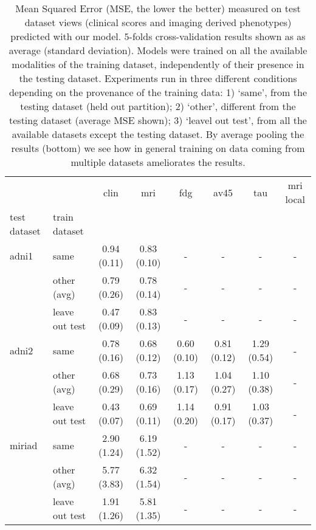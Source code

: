 \begin{table*}
\centering
\caption{
Mean Squared Error (MSE, the lower the better) measured on test dataset views (clinical scores and imaging derived phenotypes) predicted with our model.
$5$-folds cross-validation results shown as as average (standard deviation).
Models were trained on all the available modalities of the training dataset, independently of their presence in the testing dataset.
Experiments run in three different conditions depending on the provenance of the training data:
1) `same', from the testing dataset (held out partition);
2) `other', different from the testing dataset (average MSE shown);
3) `leavel out test', from all the available datasets except the testing dataset.
By average pooling the results (bottom) we see how in general training on data coming from multiple datasets ameliorates the results.
}
\label{tab:features}
\begin{tabular}{llcccccc}
\toprule
       &      &         clin &           mri &          fdg &         av45 &          tau &   mri local \\
test dataset & train dataset &              &               &              &              &              &              \\
\midrule
adni1  & same           &  0.94 (0.11) &  0.83 (0.10) &            - &            - &            - &            - \\
       & other (avg)    &  0.79 (0.26) &  0.78 (0.14) &            - &            - &            - &            - \\
       & leave out test &  0.47 (0.09) &  0.83 (0.13) &            - &            - &            - &            - \\
\midrule
adni2  & same           &  0.78 (0.16) &  0.68 (0.12) &  0.60 (0.10) &  0.81 (0.12) &  1.29 (0.54) &            - \\
       & other (avg)    &  0.68 (0.29) &  0.73 (0.16) &  1.13 (0.17) &  1.04 (0.27) &  1.10 (0.38) &            - \\
       & leave out test &  0.43 (0.07) &  0.69 (0.11) &  1.14 (0.20) &  0.91 (0.17) &  1.03 (0.37) &            - \\
\midrule
miriad & same           &  2.90 (1.24) &  6.19 (1.52) &            - &            - &            - &            - \\
       & other (avg)    &  5.77 (3.83) &  6.32 (1.54) &            - &            - &            - &            - \\
       & leave out test &  1.91 (1.26) &  5.81 (1.35) &            - &            - &            - &            - \\

\end{tabular}
\end{table*}
